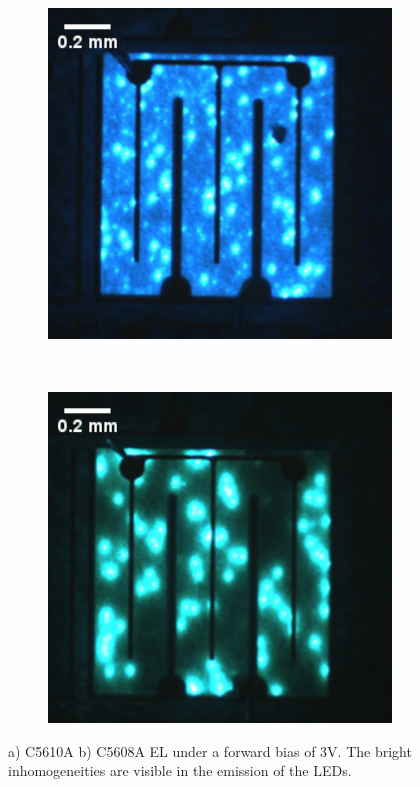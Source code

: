 \begin{figure}[h]
	\begin{subfigure}[t]{0.35\textwidth}
		\centering
		\includegraphics[width = 1\textwidth]{Figs/Ch3/5610.png}
		\caption{}
	\end{subfigure}%
	\hspace*{2cm}
	~	
	\begin{subfigure}[t]{0.35\textwidth}
		\centering
		\includegraphics[width=1\textwidth]{Figs/Ch3/5608.png}
		\caption{}
	\end{subfigure}
	\caption {a) C5610A b) C5608A EL under a forward bias of 3V. The bright inhomogeneities are visible in the emission of the LEDs. }
	\label{probe}
\end{figure}
\FloatBarrier


